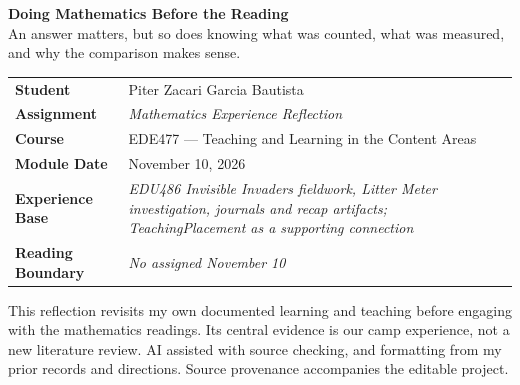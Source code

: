 \documentclass[11pt,letterpaper]{article}
\begin{document}
\begin{titlepage}
\begin{center}
\begin{minipage}{0.96\textwidth}
\end{minipage}
\end{center}
\vfill
\begin{center}
\colorbox{SoftBlue}{%
\parbox{0.88\textwidth}{%
\centering\small\vspace{0.07in}
\textbf{Doing Mathematics Before the Reading}\\[0.05in]
An answer matters, but so does knowing what was counted,\linebreak
what was measured, and why the comparison makes sense.\par\vspace{0.07in}
}%
}
\end{center}
\vfill
\begin{center}
\renewcommand{\arraystretch}{1.23}
\setlength{\tabcolsep}{5pt}
\begin{tabular}{>{\bfseries\RaggedLeft\arraybackslash}p{1.32in} >{\RaggedRight\arraybackslash}p{5.08in}}
Student & Piter Zacari Garcia Bautista \\
Assignment & \textit{\small Mathematics Experience Reflection} \\
Course & EDE477 --- Teaching and Learning in the Content Areas \\
Module Date & November 10, 2026 \\
Experience Base & \textit{\small EDU486 Invisible Invaders fieldwork, Litter Meter investigation, journals and recap artifacts; TeachingPlacement as a supporting connection} \\
Reading Boundary & \textit{\small No assigned November 10} \\
\end{tabular}
\end{center}
\vfill
\begin{center}
\begin{minipage}{0.95\textwidth}
\small
This reflection revisits my own documented learning and teaching before engaging with the mathematics readings. Its central evidence is our camp experience, not a new literature review. AI assisted with source checking, and formatting from my prior records and directions. Source provenance accompanies the editable project.
\end{minipage}
\end{center}
\end{titlepage}
\bodyformat

\end{document}
